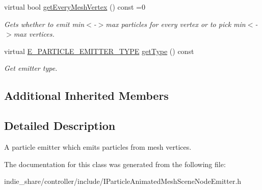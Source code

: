 \begin{DoxyCompactItemize}
\mbox{\label{classirr_1_1scene_1_1IParticleAnimatedMeshSceneNodeEmitter_afe672788259a71157ab26ff334d68c52}} 
virtual bool \hyperlink{classirr_1_1scene_1_1IParticleAnimatedMeshSceneNodeEmitter_afe672788259a71157ab26ff334d68c52}{get\+Every\+Mesh\+Vertex} () const =0
\begin{DoxyCompactList}\small\item\em Gets whether to emit min$<$-\/$>$max particles for every vertex or to pick min$<$-\/$>$max vertices. \end{DoxyCompactList}\item 
\mbox{\label{classirr_1_1scene_1_1IParticleAnimatedMeshSceneNodeEmitter_a1fb468ed4d8976e084d56d11024d310d}} 
virtual \hyperlink{namespaceirr_1_1scene_a3e251a881c886884a78adea2e546272b}{E\+\_\+\+P\+A\+R\+T\+I\+C\+L\+E\+\_\+\+E\+M\+I\+T\+T\+E\+R\+\_\+\+T\+Y\+PE} \hyperlink{classirr_1_1scene_1_1IParticleAnimatedMeshSceneNodeEmitter_a1fb468ed4d8976e084d56d11024d310d}{get\+Type} () const
\begin{DoxyCompactList}\small\item\em Get emitter type. \end{DoxyCompactList}\end{DoxyCompactItemize}
\subsection*{Additional Inherited Members}


\subsection{Detailed Description}
A particle emitter which emits particles from mesh vertices. 

The documentation for this class was generated from the following file\+:\begin{DoxyCompactItemize}
\item 
indie\+\_\+share/controller/include/I\+Particle\+Animated\+Mesh\+Scene\+Node\+Emitter.\+h\end{DoxyCompactItemize}

